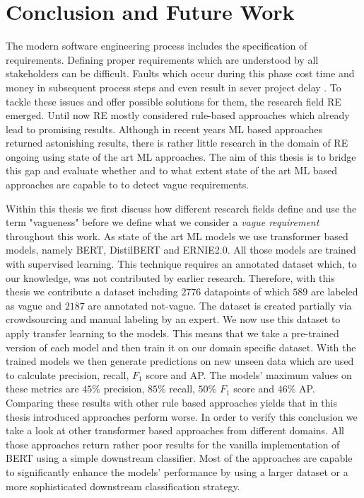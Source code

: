 \chapter{Conclusion and Future Work}
\label{chp:conclusion_and_future_work}
The modern software engineering process includes the specification of requirements.
Defining proper requirements which are understood by all stakeholders can be difficult.
Faults which occur during this phase cost time and money in subsequent process steps \parencite{Mendez:2016} and even result in sever project delay \parencite{Femmer:2014}.
To tackle these issues and offer possible solutions for them, the research field \ac{RE} emerged.
Until now \ac{RE} mostly considered rule-based approaches which already lead to promising results.
Although in recent years \ac{ML} based approaches returned astonishing results, there is rather little research in the domain of \ac{RE} ongoing using state of the art \ac{ML} approaches.
The aim of this thesis is to bridge this gap and evaluate whether and to what extent state of the art \ac{ML} based approaches are capable to to detect vague requirements.

Within this thesis we first discuss how different research fields define and use the term "vagueness" before we define what we consider a \textit{vague requirement} throughout this work.
As state of the art \ac{ML} models we use transformer based models, namely \ac{BERT}, \ac{DistilBERT} and \ac{ERNIE2.0}.
All those models are trained with supervised learning.
This technique requires an annotated dataset which, to our knowledge, was not contributed by earlier research.
Therefore, with this thesis we contribute a dataset including $2776$ datapoints of which $589$ are labeled as vague and $2187$ are annotated not-vague.
The dataset is created partially via crowdsourcing and manual labeling by an expert.
We now use this dataset to apply transfer learning to the models.
This means that we take a pre-trained version of each model and then train it on our domain specific dataset.
With the trained models we then generate predictions on new unseen data which are used to calculate precision, recall, $F_1$ score and \ac{AP}.
The models' maximum values on these metrics are $45\%$ precision, $85\%$ recall, $50\%$ $F_1$ score and $46\%$ \ac{AP}.
Comparing these results with other rule based approaches yields that in this thesis introduced approaches perform worse.
In order to verify this conclusion we take a look at other transformer based approaches from different domains.
All those approaches return rather poor results for the vanilla implementation of \ac{BERT} using a simple downstream classifier.
Most of the approaches are capable to significantly enhance the models' performance by using a larger dataset or a more sophisticated downstream classification strategy.

